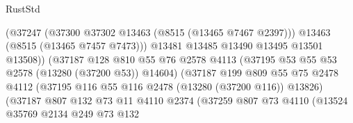 \begin{lexlean}{RustStd}
\begin{coremodule}
                                            (@37247
                                              (@37300 @37302 @13463 (@8515 (@13465 @7467 @2397)))
                                              @13463
                                              (@8515 (@13465 @7457 @7473)))
                                            @13481
                                            @13485
                                            @13490
                                            @13495
                                            @13501
                                            @13508))
                                        (@37187
                                          @128
                                          @810
                                          @55
                                          @76
                                          @2578
                                          @4113
                                          (@37195 @53 @55 @53 @2578 (@13280 (@37200 @53)) @14604)
                                          (@37187
                                            @199
                                            @809
                                            @55
                                            @75
                                            @2478
                                            @4112
                                            (@37195
                                              @116
                                              @55
                                              @116
                                              @2478
                                              (@13280 (@37200 @116))
                                              @13826)
                                            (@37187
                                              @807
                                              @132
                                              @73
                                              @11
                                              @4110
                                              @2374
                                              (@37259
                                                @807
                                                @73
                                                @4110
                                                (@13524
                                                  @35769
                                                  @2134
                                                  @249
                                                  @73
                                                  @132

\end{coremodule}
\end{lexlean}
